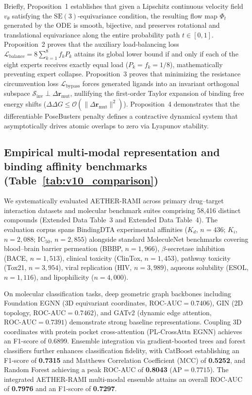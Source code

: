 \documentclass[11pt,a4paper]{article}
\begin{document}
Briefly, Proposition~1 establishes that given a Lipschitz continuous velocity field $v_\theta$ satisfying the $\mathrm{SE}(3)$-equivariance condition, the resulting flow map $\Phi_t$ generated by the ODE is smooth, bijective, and preserves rotational and translational equivariance along the entire probability path $t \in [0, 1]$. Proposition~2 proves that the auxiliary load-balancing loss $\mathcal{L}_{\text{balance}} = 8 \sum_{k=1}^8 f_k P_k$ attains its global lower bound if and only if each of the eight experts receives exactly equal load ($P_k = f_k = 1/8$), mathematically preventing expert collapse. Proposition~3 proves that minimizing the resistance circumvention loss $\mathcal{L}_{\text{bypass}}$ forces generated ligands into an invariant orthogonal subspace $\mathcal{S}_{\text{inv}} \perp \Delta \mathbf{r}_{\text{mut}}$, nullifying the first-order Taylor expansion of binding free energy shifts ($\Delta \Delta G \le \mathcal{O}(\|\Delta \mathbf{r}_{\text{mut}}\|^2)$). Proposition~4 demonstrates that the differentiable PoseBusters penalty defines a contractive dynamical system that asymptotically drives atomic overlaps to zero via Lyapunov stability.

\subsection*{Empirical multi-modal representation and binding affinity benchmarks (Table~\ref{tab:v10_comparison})}


We systematically evaluated AETHER-RAMI across primary drug--target interaction datasets and molecular benchmark suites comprising 58,416 distinct compounds (Extended Data Table~3 and Extended Data Table~4). The evaluation corpus spans BindingDTA experimental affinities ($K_d$, $n=436$; $K_i$, $n=2,088$; $\text{IC}_{50}$, $n=2,855$) alongside standard MoleculeNet benchmarks covering blood--brain barrier permeation (BBBP, $n=1,966$), $\beta$-secretase inhibition (BACE, $n=1,513$), clinical toxicity (ClinTox, $n=1,453$), pathway toxicity (Tox21, $n=3,954$), viral replication (HIV, $n=3,989$), aqueous solubility (ESOL, $n=1,116$), and lipophilicity ($n=4,000$).

On molecular classification tasks, deep geometric graph backbones including Foundation EGNN (3D equivariant coordinates, $\text{ROC-AUC} = 0.7406$), GIN (2D topology, $\text{ROC-AUC} = 0.7462$), and GATv2 (dynamic edge attention, $\text{ROC-AUC} = 0.7391$) demonstrate strong baseline representations. Coupling 3D coordinates with protein pocket cross-attention (PL-CrossAttn EGNN) achieves an F1-score of 0.6899. Ensemble integration via gradient-boosted trees and forest classifiers further enhances classification fidelity, with CatBoost establishing an F1-score of \textbf{0.7315} and Matthews Correlation Coefficient (MCC) of \textbf{0.5252}, and Random Forest achieving a peak ROC-AUC of \textbf{0.8043} ($\text{AP} = 0.7715$). The integrated AETHER-RAMI multi-modal ensemble attains an overall ROC-AUC of \textbf{0.7976} and an F1-score of \textbf{0.7297}.
\end{document}

